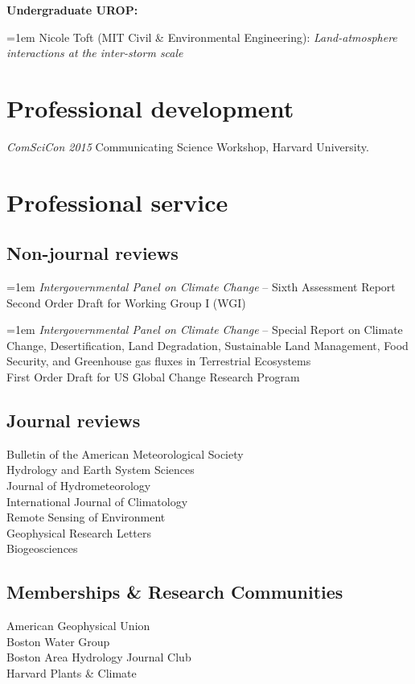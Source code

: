 \documentclass[10pt, a4paper]{article}
\renewcommand{\emph}[1]{\textit{#1}}
\newcommand{\lbr}{\vspace*{12pt}}
\newcommand{\years}[1]{\mbox{}\marginnote{\scriptsize #1}} %
\begin{document}
\textbf{ Undergraduate UROP:}
\par \years{2019} \hangindent=1em Nicole Toft (MIT Civil \& Environmental Engineering): \emph{Land-atmosphere interactions at the inter-storm scale} \lbr

\section*{Professional development}
\years{2015}\emph{ComSciCon 2015} Communicating Science Workshop, Harvard University.\\

\section*{Professional service}

\subsection*{Non-journal reviews}
\years{2020} \hangindent=1em \emph{Intergovernmental Panel on Climate Change} -- Sixth Assessment Report \\
Second Order Draft for Working Group I (WGI)
		
\years{2018} \hangindent=1em \emph{Intergovernmental Panel on Climate Change} -- Special Report on Climate Change, Desertification, Land Degradation, Sustainable Land Management, Food Security, and Greenhouse gas fluxes in Terrestrial Ecosystems \\
First Order Draft for US Global Change Research Program

\subsection*{Journal reviews}
Bulletin of the American Meteorological Society\\
Hydrology and Earth System Sciences\\
Journal of Hydrometeorology\\
International Journal of Climatology\\
Remote Sensing of Environment\\
Geophysical Research Letters\\
Biogeosciences

\subsection*{Memberships \& Research Communities}
American Geophysical Union\\ %
Boston Water Group\\ %
Boston Area Hydrology Journal Club\\ %
Harvard Plants \& Climate
\end{document}
